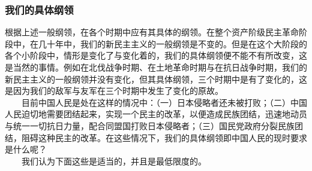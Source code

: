 \documentclass[cn,11pt,chinese]{elegantbook}
\def\myformat#1{\hfil\hfil #1}
\begin{document}
\subsubsection*{\myformat{我们的具体纲领}}
根据上述一般纲领，在各个时期中应有其具体的纲领。在整个资产阶级民主革命阶段中，在几十年中，我们的新民主主义的一般纲领是不变的。但是在这个大阶段的各个小阶段中，情形是变化了与变化着的，我们的具体纲领便不能不有所改变，这是当然的事情。例如在北伐战争时期、在土地革命时期与在抗日战争时期，我们的新民主主义的一般纲领并没有变化，但其具体纲领，三个时期中是有了变化的，这是因为我们的敌军与友军在三个时期中发生了变化的原故。\\
　　目前中国人民是处在这样的情况中：（一）日本侵略者还未被打败；（二）中国人民迫切地需要团结起来，实现一个民主的改革，以便造成民族团结，迅速地动员与统一一切抗日力量，配合同盟国打败日本侵略者；（三）国民党政府分裂民族团结，阻碍这种民主的改革。在这些情况下，我们的具体纲领即中国人民的现时要求是什么呢？\\
　　我们认为下面这些是适当的，并且是最低限度的。\\
\end{document}

